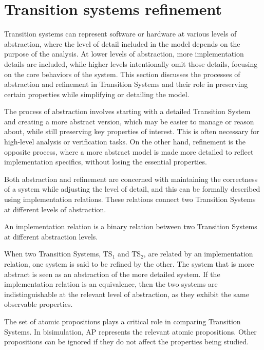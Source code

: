 \section{Transition systems refinement}

Transition systems can represent software or hardware at various levels of abstraction, where the level of detail included in the model depends on the purpose of the analysis. 
At lower levels of abstraction, more implementation details are included, while higher levels intentionally omit those details, focusing on the core behaviors of the system. 
This section discusses the processes of abstraction and refinement in Transition Systems and their role in preserving certain properties while simplifying or detailing the model.

The process of abstraction involves starting with a detailed Transition System and creating a more abstract version, which may be easier to manage or reason about, while still preserving key properties of interest. 
This is often necessary for high-level analysis or verification tasks. On the other hand, refinement is the opposite process, where a more abstract model is made more detailed to reflect implementation specifics, without losing the essential properties.

Both abstraction and refinement are concerned with maintaining the correctness of a system while adjusting the level of detail, and this can be formally described using implementation relations.
These relations connect two Transition Systems at different levels of abstraction.
\begin{definition}
    An implementation relation is a binary relation between two Transition Systems at different abstraction levels.
\end{definition}
\noindent When two Transition Systems, $\text{TS}_1$ and $\text{TS}_2$, are related by an implementation relation, one system is said to be refined by the other. 
The system that is more abstract is seen as an abstraction of the more detailed system. 
If the implementation relation is an equivalence, then the two systems are indistinguishable at the relevant level of abstraction, as they exhibit the same observable properties.

The set of atomic propositions plays a critical role in comparing Transition Systems. 
In bisimulation, $\text{AP}$ represents the relevant atomic propositions. 
Other propositions can be ignored if they do not affect the properties being studied.

